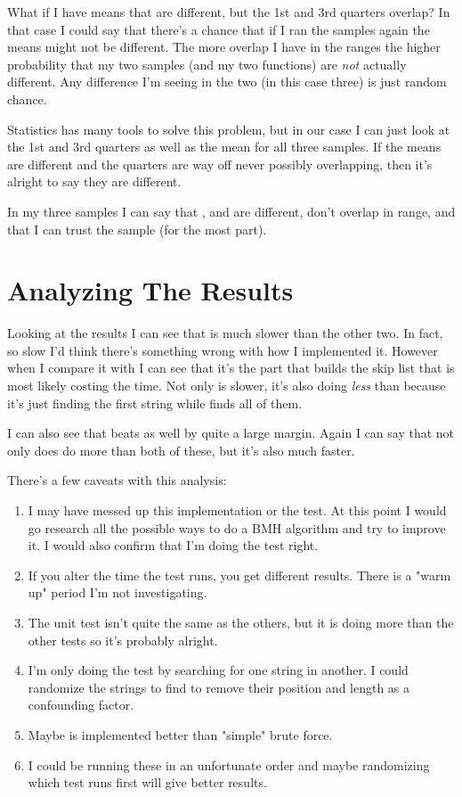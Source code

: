What if I have means that are different, but the 1st and 3rd quarters overlap?
In that case I could say that there's a chance that if I ran the samples again
the means might not be different.  The more overlap I have in the ranges the
higher probability that my two samples (and my two functions) are \emph{not}
actually different.  Any difference I'm seeing in the two (in this case three)
is just random chance.

Statistics has many tools to solve this problem, but in our case I can just
look at the 1st and 3rd quarters as well as the mean for all three samples.  If
the means are different and the quarters are way off never possibly
overlapping, then it's alright to say they are different.

In my three samples I can say that ,  and
 are different, don't overlap in range, and that I can trust the
sample (for the most part).


\section{Analyzing The Results}

Looking at the results I can see that  is much slower than
the other two.  In fact, so slow I'd think there's something wrong with how I
implemented it.  However when I compare it with  I
can see that it's the part that builds the skip list that is most likely
costing the time.  Not only is  slower, it's also doing \emph{less}
than  because it's just finding the first string while 
finds all of them.

I can also see that  beats  as well by quite a large
margin.  Again I can say that not only does  do more than both of
these, but it's also much faster.

There's a few caveats with this analysis:

\begin{enumerate}
\item I may have messed up this implementation or the test. At this
    point I would go research all the possible ways to do a BMH algorithm
    and try to improve it.  I would also confirm that I'm doing the test
    right.
\item If you alter the time the test runs, you get different results.
    There is a "warm up" period I'm not investigating.
\item The  unit test isn't quite the
    same as the others, but it is doing more than the other tests so
    it's probably alright.
\item I'm only doing the test by searching for one string in another.
    I could randomize the strings to find to remove their position
    and length as a confounding factor.
\item Maybe  is implemented better than "simple" brute force.
\item I could be running these in an unfortunate order and maybe randomizing
    which test runs first will give better results.
\end{enumerate}

